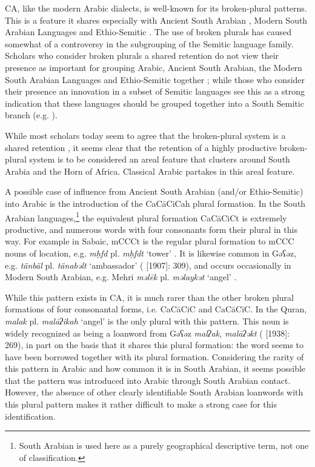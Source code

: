 \documentclass[output=paper]{langsci/langscibook}
\begin{document}
CA, like the modern Arabic dialects, is well-known for its broken-plural patterns. This is a feature it shares especially with Ancient South Arabian \citep[1050--1051]{Stein2011}, Modern South Arabian Languages \citep[1085]{Simeone-Senelle2011} and Ethio-Semitic \citep[1132]{Weninger2011OldEth}. The use of broken plurals has caused somewhat of a controversy in the subgrouping of the Semitic language family. Scholars who consider broken plurals a shared retention do not view their presence as important for grouping Arabic, Ancient South Arabian, the Modern South Arabian Languages and Ethio-Semitic together \citep[159--160]{Huehnergard2005}; while those who consider their presence an innovation in a subset of Semitic languages see this as a strong indication that these languages should be grouped together into a South Semitic branch (e.g. \citealt{Ratcliffe1998}).

While most scholars today seem to agree that the broken-plural system is a shared retention \citep[1116]{Weninger2011GenEth}, it seems clear that the retention of a highly productive broken-plural system is to be considered an areal feature that clusters around South Arabia and the Horn of Africa. Classical Arabic partakes in this areal feature.

A possible case of influence from Ancient South Arabian (and/or Ethio-Semitic) into Arabic is the introduction of the CaCāCiCah plural formation. In the South Arabian languages,\footnote{South Arabian is used here as a purely geographical descriptive term, not one of classification.} the equivalent plural formation CaCāCiCt is extremely productive, and numerous words with four consonants form their plural in this way. For example in Sabaic, mCCCt is the regular plural formation to mCCC nouns  of location, e.g. \textit{mḥfd} pl. \textit{mḥfdt} ‘tower’ \citep[34]{Beeston1962}. It is likewise common in Gəʕəz, e.g. \textit{tänbäl} pl. \textit{tänabəlt} ‘ambassador’ (\citealt{Dillmann2005} [1907]: 309), and occurs occasionally in Modern South Arabian, e.g. Mehri \textit{məlēk} pl. \textit{məlaykət} ‘angel’ \citep[68]{Rubin2010}.

While this pattern exists in CA, it is much rarer than the other broken plural formations of four consonantal forms, i.e. CaCāCiC and CaCāCīC. In the Quran, \textit{malak} pl. \textit{malāʔikah} ‘angel’ is the only plural with this pattern. This noun is widely recognized as being a loanword from Gəʕəz \textit{malʔak,} \textit{malāʔəkt} (\citealt{Jeffrey2007} [1938]: 269), in part on the basis that it shares this plural formation: the word seems to have been borrowed together with its plural formation. Considering the rarity of this pattern in Arabic and how common it is in South Arabian, it seems possible that the pattern was introduced into Arabic through South Arabian contact. However, the absence of other clearly identifiable South Arabian loanwords with this plural pattern makes it rather difficult to make a strong case for this identification.
\end{document}
